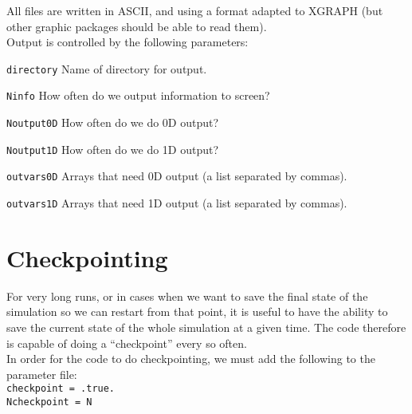 \documentclass[12pt]{article}
\begin{document}
All files are written in ASCII, and using a format adapted to XGRAPH
(but other graphic packages should be able to read them).\\

Output is controlled by the following parameters:

\begin{list}{}{
\setlength{\leftmargin}{35mm}
\setlength{\labelsep}{10mm}
\setlength{\labelwidth}{20mm}}

\item[\texttt{directory}] Name of directory for output.

\item[\texttt{Ninfo}] How often do we output information to screen?

\item[\texttt{Noutput0D}] How often do we do 0D output?

\item[\texttt{Noutput1D}] How often do we do 1D output?

\item[\texttt{outvars0D}] Arrays that need 0D output (a list separated by commas).

\item[\texttt{outvars1D}] Arrays that need 1D output (a list separated by commas).

\end{list}

\vspace{3mm}



\setcounter{equation}{0}
\section{Checkpointing}
\label{sec:checkpoint}

For very long runs, or in cases when we want to save the final state
of the simulation so we can restart from that point, it is useful to
have the ability to save the current state of the whole simulation at
a given time. The code therefore is capable of doing a ``checkpoint''
every so often. \\

In order for the code to do checkpointing, we must add the following
to the parameter file: \\

\texttt{checkpoint = .true.} \\
\texttt{Ncheckpoint = N} \\
\end{document}
